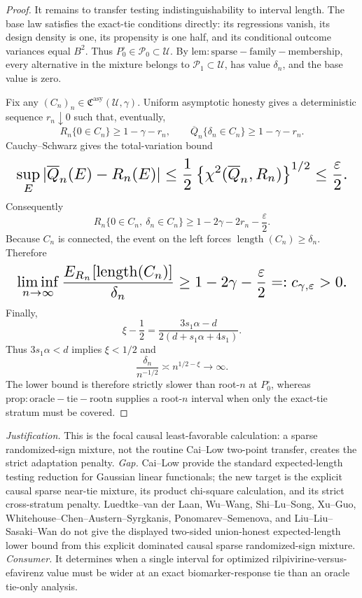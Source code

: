 \documentclass{article}
\begin{document}
\begin{proof}
It remains to transfer testing indistinguishability to interval length.  The base law satisfies the exact-tie conditions directly: its regressions vanish, its design density is one, its propensity is one half, and its conditional outcome variances equal \(B^2\).  Thus \(P_0^\circ\in\mathcal P_0\subset\mathcal U\).  By \(\mathrm{lem:sparse-family-membership}\), every alternative in the mixture belongs to \(\mathcal P_1\subset\mathcal U\), has value \(\delta_n\), and the base value is zero.

Fix any \((C_n)_n\in\mathfrak C^{\mathrm{asy}}(\mathcal U,\gamma)\).  Uniform asymptotic honesty gives a deterministic sequence \(r_n\downarrow0\) such that, eventually,
\[
 R_n\{0\in C_n\}\ge1-\gamma-r_n,
 \qquad
 \overline Q_n\{\delta_n\in C_n\}\ge1-\gamma-r_n.
\]
Cauchy--Schwarz gives the total-variation bound
\[
\makebox[\linewidth][c]{\resizebox{0.98\linewidth}{!}{\(\displaystyle \sup_E|\overline Q_n(E)-R_n(E)|
 \le\frac12\left\{\chi^2(\overline Q_n,R_n)\right\}^{1/2}
 \le\frac\varepsilon2.\)}}
\]
Consequently
\[
 R_n\{0\in C_n,\ \delta_n\in C_n\}
 \ge1-2\gamma-2r_n-\frac\varepsilon2.
\]
Because \(C_n\) is connected, the event on the left forces \(\operatorname{length}(C_n)\ge\delta_n\).  Therefore
\[
\makebox[\linewidth][c]{\resizebox{0.98\linewidth}{!}{\(\displaystyle \liminf_{n\to\infty}
 \frac{E_{R_n}[\operatorname{length}(C_n)]}{\delta_n}
 \ge1-2\gamma-\frac\varepsilon2
 =:c_{\gamma,\varepsilon}>0.\)}}
\]
Finally,
\[
 \xi-\frac12
 =\frac{3s_1\alpha-d}{2(d+s_1\alpha+4s_1)}.
\]
Thus \(3s_1\alpha<d\) implies \(\xi<1/2\) and
\[
 \frac{\delta_n}{n^{-1/2}}\asymp n^{1/2-\xi}\longrightarrow\infty.
\]
The lower bound is therefore strictly slower than root-\(n\) at \(P_0^\circ\), whereas \(\mathrm{prop:oracle-tie-rootn}\) supplies a root-\(n\) interval when only the exact-tie stratum must be covered.
\end{proof}
\par\smallskip\noindent \textit{Justification.} This is the focal causal least-favorable calculation: a sparse randomized-sign mixture, not the routine Cai--Low two-point transfer, creates the strict adaptation penalty. \textit{Gap.} Cai--Low provide the standard expected-length testing reduction for Gaussian linear functionals; the new target is the explicit causal sparse near-tie mixture, its product chi-square calculation, and its strict cross-stratum penalty. Luedtke--van der Laan, Wu--Wang, Shi--Lu--Song, Xu--Guo, Whitehouse--Chen--Austern--Syrgkanis, Ponomarev--Semenova, and Liu--Liu--Sasaki--Wan do not give the displayed two-sided union-honest expected-length lower bound from this explicit dominated causal sparse randomized-sign mixture. \textit{Consumer.} It determines when a single interval for optimized rilpivirine-versus-efavirenz value must be wider at an exact biomarker-response tie than an oracle tie-only analysis.
\end{document}
